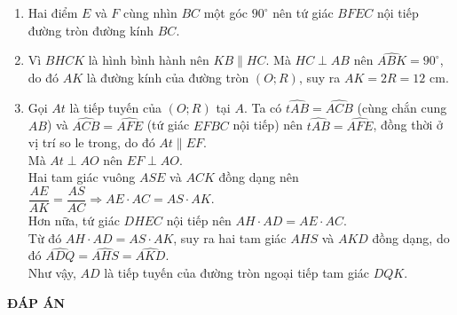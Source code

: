 \begin{ex}
{\begin{enumerate}
		\item Hai điểm $E$ và $F$ cùng nhìn $BC$ một góc $90^{\circ}$ nên tứ giác $BFEC$ nội tiếp đường tròn đường kính $BC$.
		\item Vì $BHCK$ là hình bình hành nên $KB\parallel HC$. Mà $HC \perp AB$ nên $\widehat{ABK}=90^{\circ}$, do đó $AK$ là đường kính của đường tròn $(O;R)$, suy ra $AK=2R=12$ cm.
		\item Gọi $At$ là tiếp tuyến của $(O;R)$ tại $A$. Ta có $\widehat{tAB}=\widehat{ACB}$ (cùng chắn cung $AB$) và $\widehat{ACB}=\widehat{AFE}$ (tứ giác $EFBC$ nội tiếp) nên $\widehat{tAB}=\widehat{AFE}$, đồng thời ở vị trí so le trong, do đó $At \parallel EF$. \\
		Mà $At\perp AO$ nên $EF\perp AO$.\\
		Hai tam giác vuông $ASE$ và $ACK$ đồng dạng nên $\dfrac{AE}{AK}=\dfrac{AS}{AC} \Rightarrow AE\cdot AC=AS\cdot AK$.\\
		Hơn nữa, tứ giác $DHEC$  nội tiếp nên $AH\cdot AD=AE\cdot AC$.\\
		Từ đó $AH\cdot AD=AS\cdot AK$, suy ra hai tam giác $AHS$ và $AKD$ đồng dạng, do đó $\widehat{ADQ}=\widehat{AHS}=\widehat{AKD}$.\\
		Như vậy, $AD$ là tiếp tuyến của đường tròn ngoại tiếp tam giác $DQK$.
	\end{enumerate}
	}
\end{ex}
\newpage
\begin{center}
	\textbf{ĐÁP ÁN}
\end{center}
\begin{multicols}{10}
	 
\end{multicols}